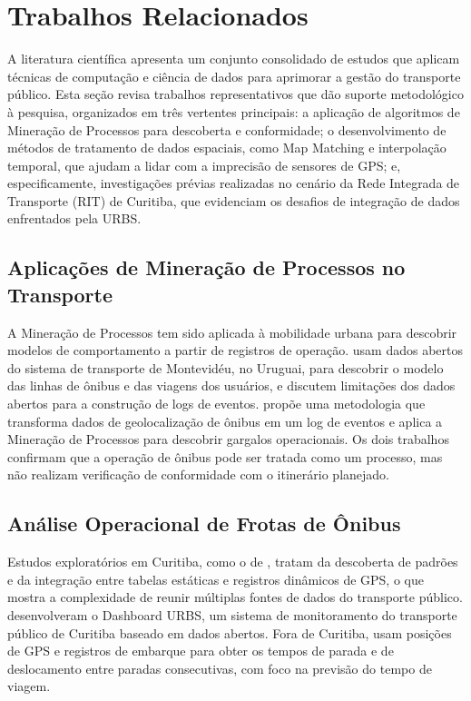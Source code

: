 \section{Trabalhos Relacionados}\label{sec:trabalhosRelacionados}

A literatura científica apresenta um conjunto consolidado de estudos que aplicam técnicas de computação e ciência de dados para aprimorar a gestão do transporte público. Esta seção revisa trabalhos representativos que dão suporte metodológico à pesquisa, organizados em três vertentes principais: a aplicação de algoritmos de Mineração de Processos para descoberta e conformidade; o desenvolvimento de métodos de tratamento de dados espaciais, como Map Matching e interpolação temporal, que ajudam a lidar com a imprecisão de sensores de GPS; e, especificamente, investigações prévias realizadas no cenário da Rede Integrada de Transporte (RIT) de Curitiba, que evidenciam os desafios de integração de dados enfrentados pela URBS.

\subsection{Aplicações de Mineração de Processos no Transporte}\label{subsec:mpTransporte}

A Mineração de Processos tem sido aplicada à mobilidade urbana para descobrir modelos de comportamento a partir de registros de operação.  usam dados abertos do sistema de transporte de Montevidéu, no Uruguai, para descobrir o modelo das linhas de ônibus e das viagens dos usuários, e discutem limitações dos dados abertos para a construção de logs de eventos.  propõe uma metodologia que transforma dados de geolocalização de ônibus em um log de eventos e aplica a Mineração de Processos para descobrir gargalos operacionais. Os dois trabalhos confirmam que a operação de ônibus pode ser tratada como um processo, mas não realizam verificação de conformidade com o itinerário planejado.

\subsection{Análise Operacional de Frotas de Ônibus}\label{subsec:frotas}

Estudos exploratórios em Curitiba, como o de , tratam da descoberta de padrões e da integração entre tabelas estáticas e registros dinâmicos de GPS, o que mostra a complexidade de reunir múltiplas fontes de dados do transporte público.  desenvolveram o Dashboard URBS, um sistema de monitoramento do transporte público de Curitiba baseado em dados abertos. Fora de Curitiba,  usam posições de GPS e registros de embarque para obter os tempos de parada e de deslocamento entre paradas consecutivas, com foco na previsão do tempo de viagem.

